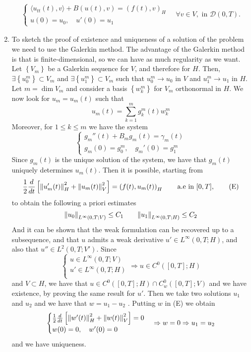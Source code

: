 \begin{enumerate}
\[\begin{split}
            \begin{cases}
                \langle u_{tt}(t), v \rangle + B(u(t), v) = (f(t), v)_H \\
                u(0) = u_0, \quad u'(0) = u_1
            \end{cases}\quad \forall v \in V, \text{ in } \mathcal{D}(0, T).
        \end{split}
    \]
    \item To sketch the proof of existence and uniqueness of a solution of the problem we need to use the Galerkin method. The advantage of the Galerkin method is that is finite-dimensional, so we can have as much regularity as we want. Let \(\left\{V_m\right\}\) be a Galerkin sequence for \(V\), and therefore for \(H\). Then, \(\exists \left\{u_0^m\right\} \subset V_m\) and \(\exists \left\{u_1^m\right\} \subset V_m\) such that \(u_0^m \to u_0\) in \(V\) and \(u_1^m \to u_1\) in \(H\). Let \(m = \dim V_m\) and consider a basis \(\left\{w_k^m\right\}\) for \(V_m\) orthonormal in \(H\). We now look for \(u_m = u_m(t)\) such that
    \[
        u_m(t) = \sum_{k=1}^m g_k^m(t) w_k^m
    \]
    Moreover, for \(1 \leq k \leq m\) we have the system
    \[
        \begin{cases}
            g_m''(t) + B_m g_m(t) = \gamma_m(t) \\
            g_m(0) = g_0^m, \quad g_m'(0) = g_1^m
        \end{cases}
    \]
    Since \(g_m(t)\) is the unique solution of the system, we have that \(g_m(t)\) uniquely determines \(u_m(t)\). Then it is possible, starting from 
    \[
        \frac{1}{2}\frac{d}{dt} \left[\norm{u_m'(t)}_H^2 + \norm{u_m(t)}_V^2\right] = \left(f(t), u_m(t)\right)_H \qquad \text{a.e in } [0, T],
        \tag*{(E)}
    \]
    to obtain the following a priori estimates
    \[
        \norm{u_0}_{L^\infty(0, T; V)} \leq C_1 \qquad \norm{u_1}_{L^\infty(0, T; H)} \leq C_2
    \]
    And it can be shown that the weak formulation can be recovered up to a subsequence, and that \(u\) admits a weak derivative \(u' \in L^\infty(0, T; H)\), and also that \(u'' \in L^2(0, T; V')\).
    Since 
    \[
    \begin{cases}
        u \in L^\infty(0, T; V) \\
        u' \in L^\infty(0, T; H) \\
    \end{cases}
    \Rightarrow u \in C^0([0, T]; H) 
    \]
    and \(V \subset H\), we have that \(u \in C^0([0, T]; H) \cap C_w^0([0, T]; V)\) and we have existence, by proving the same result for \(u'\).
    Then we take two solutions \(u_1\) and \(u_2\) and we have that \(w = u_1 - u_2\) . Putting \(w\) in (E) we obtain
    \[
        \begin{cases}
            \frac{1}{2}\frac{d}{dt} \left[\norm{w'(t)}_H^2 + \norm{w(t)}_V^2\right] = 0 \\
            w(0) = 0, \quad w'(0) = 0
        \end{cases} 
        \Rightarrow w = 0 \Rightarrow u_1 = u_2
    \]
    and we have uniqueness.
\end{enumerate}

